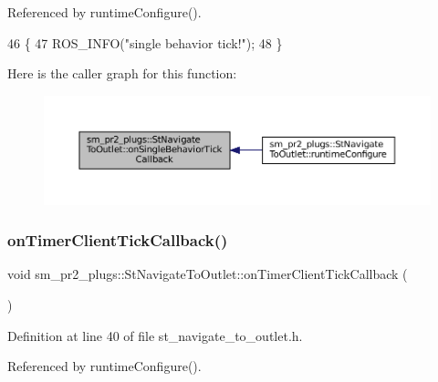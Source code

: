 Referenced by runtime\+Configure().


\begin{DoxyCode}
46     \{
47         ROS\_INFO(\textcolor{stringliteral}{"single behavior tick!"});
48     \}
\end{DoxyCode}
Here is the caller graph for this function\+:
\nopagebreak
\begin{figure}[H]
\begin{center}
\leavevmode
\includegraphics[width=350pt]{structsm__pr2__plugs_1_1StNavigateToOutlet_ae6a6ee95bcc854792f0b16286a113a06_icgraph}
\end{center}
\end{figure}
\mbox{\label{structsm__pr2__plugs_1_1StNavigateToOutlet_ab990f0f422deb0ef6dd4fcce9cb2823b}} 
\subsubsection{\texorpdfstring{on\+Timer\+Client\+Tick\+Callback()}{onTimerClientTickCallback()}}
{\footnotesize\ttfamily void sm\+\_\+pr2\+\_\+plugs\+::\+St\+Navigate\+To\+Outlet\+::on\+Timer\+Client\+Tick\+Callback (\begin{DoxyParamCaption}{ }\end{DoxyParamCaption})\hspace{0.3cm}{\ttfamily [inline]}}



Definition at line 40 of file st\+\_\+navigate\+\_\+to\+\_\+outlet.\+h.



Referenced by runtime\+Configure().


